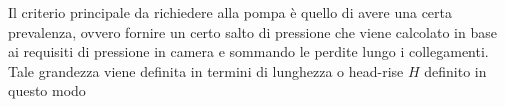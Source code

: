 Il criterio principale da richiedere alla pompa è quello di avere una certa prevalenza, ovvero fornire un certo salto di pressione che viene calcolato in base ai requisiti di pressione  in camera e sommando le perdite lungo i collegamenti. Tale grandezza viene definita in termini di lunghezza o head-rise $H$ definito in questo modo

